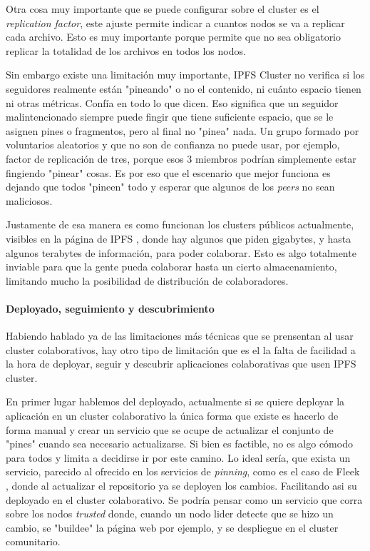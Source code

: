 Otra cosa muy importante que se puede configurar sobre el cluster es el \textit{replication factor}, este ajuste permite indicar a cuantos nodos se va a replicar cada archivo. Esto es muy importante porque permite que no sea obligatorio replicar la totalidad de los archivos en todos los nodos. 

Sin embargo existe una limitación muy importante, IPFS Cluster no verifica si los seguidores realmente están "pineando" o no el contenido, ni cuánto espacio tienen ni otras métricas. Confía en todo lo que dicen. Eso significa que un seguidor malintencionado siempre puede fingir que tiene suficiente espacio, que se le asignen pines o fragmentos, pero al final no "pinea" nada. Un grupo formado por voluntarios aleatorios y que no son de confianza no puede usar, por ejemplo, factor de replicación de tres, porque esos 3 miembros podrían simplemente estar fingiendo "pinear" cosas. Es por eso que el escenario que mejor funciona es dejando que todos "pineen" todo y esperar que algunos de los \textit{peers} no sean maliciosos.

Justamente de esa manera es como funcionan los clusters públicos actualmente, visibles en la página de IPFS \cite{collaborative-clusters}, donde hay algunos que piden gigabytes, y hasta algunos terabytes de información, para poder colaborar. Esto es algo totalmente inviable para que la gente pueda colaborar hasta un cierto almacenamiento, limitando mucho la posibilidad de distribución de colaboradores.

\paragraph{Deployado, seguimiento y descubrimiento}

Habiendo hablado ya de las limitaciones más técnicas que se prensentan al usar cluster colaborativos, hay otro tipo de limitación que es el la falta de facilidad a la hora de deployar, seguir y descubrir aplicaciones colaborativas que usen IPFS cluster.

En primer lugar hablemos del deployado, actualmente si se quiere deployar la aplicación en un cluster colaborativo la única forma que existe es hacerlo de forma manual y crear un servicio que se ocupe de actualizar el conjunto de "pines" cuando sea necesario actualizarse. Si bien es factible, no es algo cómodo para todos y limita a decidirse ir por este camino. Lo ideal sería, que exista un servicio, parecido al ofrecido en los servicios de \textit{pinning}, como es el caso de Fleek \cite{fleek}, donde al actualizar el repositorio ya se deployen los cambios. Facilitando asi su deployado en el cluster colaborativo. Se podría pensar como un servicio que corra sobre los nodos \textit{trusted} donde, cuando un nodo lider detecte que se hizo un cambio, se "buildee" la página web por ejemplo, y se despliegue en el cluster comunitario.

